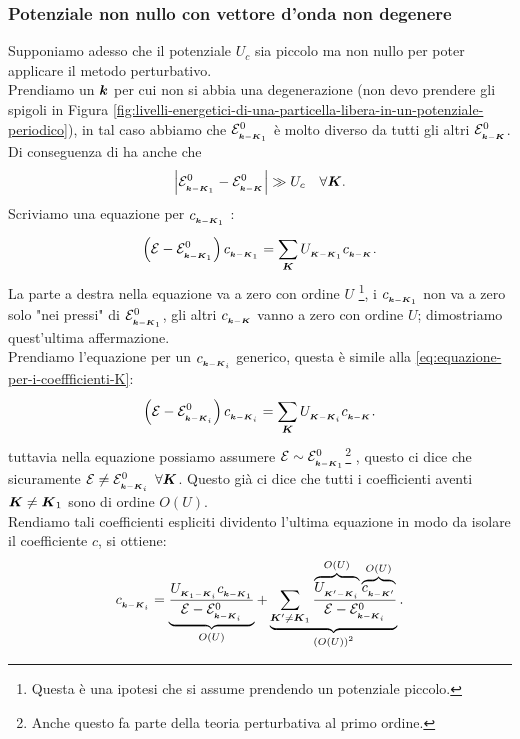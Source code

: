 \subsubsection{Potenziale non nullo con vettore d'onda non degenere}
\label{subsubsec:Potenziale non nullo con vettore d'onda non degenere}
Supponiamo adesso che il potenziale $U_c$ sia piccolo ma non nullo per poter applicare il metodo perturbativo. \\
Prendiamo un $\boldsymbol{k}$ per cui non si abbia una degenerazione (non devo prendere gli spigoli in Figura \ref{fig:livelli-energetici-di-una-particella-libera-in-un-potenziale-periodico}), in tal caso abbiamo che $\mathcal{E}^0_{_{\boldsymbol{k}-\boldsymbol{K}_1}}$ è molto diverso da tutti gli altri $\mathcal{E}^0_{_{\boldsymbol{k}-\boldsymbol{K}}}$. Di conseguenza di ha anche che
\[
	\left| \mathcal{E}^0_{_{\boldsymbol{k}-\boldsymbol{K}_1}} - 
	\mathcal{E}^0_{_{\boldsymbol{k}-\boldsymbol{K}}}  \right| \gg 
	U_c \quad
	\forall \boldsymbol{K}
.\]	
Scriviamo una equazione per $c_{_{\boldsymbol{k}-\boldsymbol{K}_1}}$ :
\[
	\left( \mathcal{E}  - \mathcal{E}^0_{_{\boldsymbol{k}-\boldsymbol{K}_1}} \right)
	c_{_{\boldsymbol{k}-\boldsymbol{K}_1}} 
	=
	\sum_{\boldsymbol{K}}^{} U_{_{\boldsymbol{K}-\boldsymbol{K}_1}}c_{_{\boldsymbol{k}-\boldsymbol{K}}} 
	\label{eq:equazione-per-i-coeffficienti-K}
.\] 
La parte a destra nella equazione va a zero con ordine $U$ \footnote{Questa è una ipotesi che si assume prendendo un potenziale piccolo.},
i $c_{_{\boldsymbol{k}-\boldsymbol{K}_1}}$ non va a zero solo "nei pressi" di $\mathcal{E}^0_{_{\boldsymbol{k}-\boldsymbol{K}_1}}$,
gli altri $c_{_{\boldsymbol{k}-\boldsymbol{K}}}$ vanno a zero con ordine $U$; dimostriamo quest'ultima affermazione.\\
Prendiamo l'equazione per un $c_{_{\boldsymbol{k}-\boldsymbol{K}_i}}$ generico,
questa è simile alla \ref{eq:equazione-per-i-coeffficienti-K}:
\[
	\left( \mathcal{E}  - \mathcal{E}^0_{_{\boldsymbol{k}-\boldsymbol{K}_i}} \right)
	c_{_{\boldsymbol{k}-\boldsymbol{K}_i}} 
	=
	\sum_{\boldsymbol{K}}^{} U_{_{\boldsymbol{K}-\boldsymbol{K}_i}}c_{_{\boldsymbol{k}-\boldsymbol{K}}} 
.\] 
tuttavia nella equazione possiamo assumere $\mathcal{E}  \sim \mathcal{E}^0_{_{\boldsymbol{k}-\boldsymbol{K}_1}}$\footnote{Anche questo fa parte della teoria perturbativa al primo ordine.} ,
questo ci dice che sicuramente $\mathcal{E}  \neq \mathcal{E}^0_{_{\boldsymbol{k}-\boldsymbol{K}_i}}$ $\forall \boldsymbol{K}$. Questo già ci dice che tutti i coefficienti aventi $\boldsymbol{K} \neq \boldsymbol{K}_1$ sono di ordine $O(U)$. \\
Rendiamo tali coefficienti espliciti dividento l'ultima equazione in modo da isolare il coefficiente $c$, si ottiene:
\[
	c_{_{\boldsymbol{k}-\boldsymbol{K}_i}} = 
	\underbrace{
	\frac{U_{_{\boldsymbol{K}_1-\boldsymbol{K}_i}}c_{_{\boldsymbol{k}-\boldsymbol{K}_1}}}
	{\mathcal{E}-\mathcal{E}^0_{_{\boldsymbol{k}-\boldsymbol{K}_i}}}
	}_{
	O(U)}
	+
	\underbrace{
	\sum_{\boldsymbol{K}' \neq \boldsymbol{K}_1}^{} 
	\frac{
	\overbrace{
	U_{_{\boldsymbol{K}'-\boldsymbol{K}_i}}
	}^{O(U)}
	\overbrace{
	c_{_{\boldsymbol{k}-\boldsymbol{K}'}}
	}^{O(U)}}
	{\mathcal{E}-\mathcal{E}^0_{_{\boldsymbol{k}-\boldsymbol{K}_i}}}
	}_{\left( O(U) \right) ^2}
.\] 
